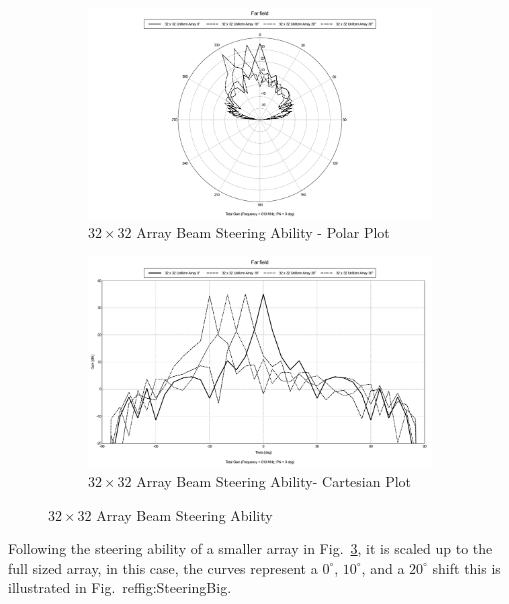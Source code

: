 \documentclass[11pt]{witseiepaper}
\begin{document}
\begin{figure}[htb]
    \centering
    \begin{subfigure}{.5\textwidth}
        \centering
            \includegraphics[width=0.9\linewidth]{SteeringSmall-Polar.pdf}
            \caption{$32 \times 32$ Array Beam Steering Ability - Polar Plot}
            \label{fig:SteeringSmall-Polar}
        \end{subfigure}%
        \begin{subfigure}{.5\textwidth}
            \centering
            \includegraphics[width=0.9\linewidth]{SteeringSmall-Cartesian.pdf}
            \caption{$32 \times 32$ Array Beam Steering Ability- Cartesian Plot}
                \label{fig:SteeringSmall-Cartesian}
            \end{subfigure}
\caption{$32 \times 32$ Array Beam Steering Ability}
\label{fig:SteeringSmall}
\end{figure}


Following the steering ability of a smaller array in Fig.~\ref{fig:SteeringSmall}, it is scaled up to the full sized array, in this case, the curves represent a $0^{\circ}$, $10^{\circ}$, and a $20^{\circ}$ shift this is illustrated in Fig.~ref{fig:SteeringBig}.
\end{document}
